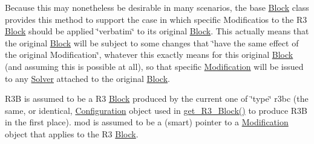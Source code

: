 Because this may nonetheless be desirable in many scenarios, the base \mbox{\hyperlink{class_s_m_spp__di__unipi__it_1_1_block}{Block}} class provides this method to support the case in which specific Modificatios to the R3 \mbox{\hyperlink{class_s_m_spp__di__unipi__it_1_1_block}{Block}} should be applied \char`\"{}verbatim\char`\"{} to its original \mbox{\hyperlink{class_s_m_spp__di__unipi__it_1_1_block}{Block}}. This actually means that the original \mbox{\hyperlink{class_s_m_spp__di__unipi__it_1_1_block}{Block}} will be subject to some changes that \char`\"{}have the same effect of the original Modification\char`\"{}, whatever this exactly means for this original \mbox{\hyperlink{class_s_m_spp__di__unipi__it_1_1_block}{Block}} (and assuming this is possible at all), so that specific \mbox{\hyperlink{class_s_m_spp__di__unipi__it_1_1_modification}{Modification}} will be issued to any \mbox{\hyperlink{class_s_m_spp__di__unipi__it_1_1_solver}{Solver}} attached to the original \mbox{\hyperlink{class_s_m_spp__di__unipi__it_1_1_block}{Block}}.

R3B is assumed to be a R3 \mbox{\hyperlink{class_s_m_spp__di__unipi__it_1_1_block}{Block}} produced by the current one of \char`\"{}type\char`\"{} r3bc (the same, or identical, \mbox{\hyperlink{class_s_m_spp__di__unipi__it_1_1_configuration}{Configuration}} object used in \mbox{\hyperlink{class_s_m_spp__di__unipi__it_1_1_block_a2e682f5c0d4a74503c0cb5ab38fb6428}{get\+\_\+\+R3\+\_\+\+Block()}} to produce R3B in the first place). mod is assumed to be a (smart) pointer to a \mbox{\hyperlink{class_s_m_spp__di__unipi__it_1_1_modification}{Modification}} object that applies to the R3 \mbox{\hyperlink{class_s_m_spp__di__unipi__it_1_1_block}{Block}}.

